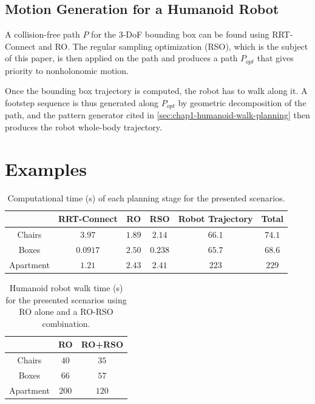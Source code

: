 \subsection{Motion Generation for a Humanoid Robot}

A collision-free path $P$ for the 3-DoF bounding box can be found
using RRT-Connect and RO. The regular sampling optimization (RSO),
which is the subject of this paper, is then applied on the path and
produces a path $P_{opt}$ that gives priority to nonholonomic motion.

Once the bounding box trajectory is computed, the robot has to walk
along it. A footstep sequence is thus generated along $P_{opt}$ by
geometric decomposition of the path, and the pattern generator cited
in \autoref{sec:chap1-humanoid-walk-planning} then produces the robot
whole-body trajectory.

\section{Examples}
\label{sec:chap1-examples}

\begin{table}
\label{tab:chap1-computation-time}
\centering
\begin{tabular}{c|c|c|c|c|c|}
  \cline{2-6}
  & RRT-Connect & RO & RSO & Robot Trajectory & Total\\
  \hline
  \multicolumn{1}{|c|}{Chairs} & $3.97$ & $1.89$ & $2.14$ & $66.1$ & $74.1$\\
  \hline
  \multicolumn{1}{|c|}{Boxes} & $0.0917$ & $2.50$ & $0.238$ & $65.7$ & $68.6$\\
  \hline
  \multicolumn{1}{|c|}{Apartment} & $1.21$ & $2.43$ & $2.41$ & $223$ & $229$ \\
  \hline
\end{tabular}
\caption{Computational time (s) of each planning stage for the
  presented scenarios.}
\end{table}

\begin{table}
\label{tab:chap1-walk-time}
\centering
\begin{tabular}{c|c|c|}
  \cline{2-3}
  & RO & RO+RSO \\
  \hline
  \multicolumn{1}{|c|}{Chairs} & $40$ & $35$ \\
  \hline
  \multicolumn{1}{|c|}{Boxes} & $66$ & $57$ \\
  \hline
  \multicolumn{1}{|c|}{Apartment} & $200$ & $120$ \\
  \hline
\end{tabular}
\caption{Humanoid robot walk time (s) for the presented scenarios
  using RO alone and a RO-RSO combination.}
\end{table}

